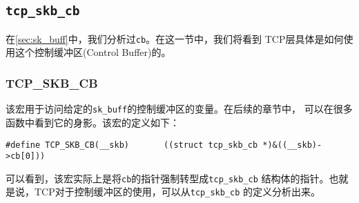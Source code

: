         \subsection{\texttt{tcp_skb_cb}}
\label{sec:tcp_skb_cb}

在\ref{sec:sk_buff}中，我们分析过\texttt{cb}。在这一节中，我们将看到
TCP层具体是如何使用这个控制缓冲区(Control Buffer)的。

            \subsubsection{TCP\_SKB\_CB}
\label{subsec:tcp_skb_cb}

该宏用于访问给定的\texttt{sk_buff}的控制缓冲区的变量。在后续的章节中，
可以在很多函数中看到它的身影。该宏的定义如下：

\begin{verbatim}
#define TCP_SKB_CB(__skb)       ((struct tcp_skb_cb *)&((__skb)->cb[0]))
\end{verbatim}

可以看到，该宏实际上是将\texttt{cb}的指针强制转型成\texttt{tcp_skb_cb}
结构体的指针。也就是说，TCP对于控制缓冲区的使用，可以从\texttt{tcp_skb_cb}
的定义分析出来。

